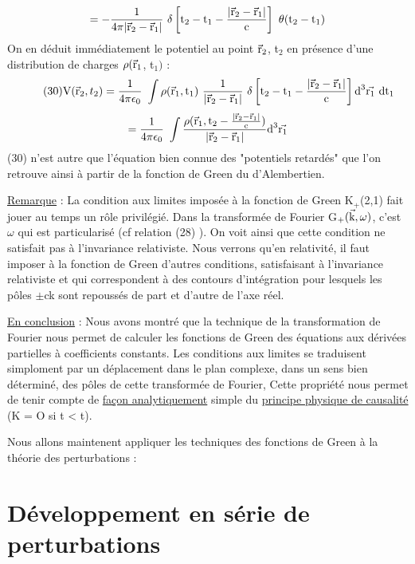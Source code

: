 \[
=-\frac{1}{4\pi|\vec{\mt{r}}_2-\vec{\mt{r}}_1|}\ \delta\left[\mt{t}_2-\mt{t}_1-\frac{|\vec{\mt{r}}_2-\vec{\mt{r}}_1|}{\mt{c}}\right]\ \theta(\mt{t}_2-\mt{t}_1)
\]
On en déduit immédiatement le potentiel au point $\vec{\text{r}}_2$, t$_2$  en présence d'une
distribution de charges $\rho(\vec{\text{r}}_1$, t$_1)$ :
\[
\tag{30}\mt{V}(\vec{\mt{r}}_2, t_2)=\frac{1}{4\pi\epsilon_0}\ \int \rho(\vec{\mt{r}}_1, \mt{t}_1)\ \frac{1}{|\vec{\mt{r}}_2-\vec{\mt{r}}_1|}\ 
\delta\left[\mt{t}_2-\mt{t}_1-\frac{|\vec{\mt{r}}_2-\vec{\mt{r}}_1|}{\mt{c}}\right]\mt{d}^3\vec{\mt{r}_1}\mt{ dt}_1
\]
\[
=\frac{1}{4\pi\epsilon_0}\ \int \frac{\rho(\vec{\mt{r}}_1, \mt{t}_2-\frac{|\vec{\mt{r}}_2-\vec{\mt{r}}_1|}{\mt{c}})}{|\vec{\mt{r}}_2-\vec{\mt{r}}_1|}
\mt{d}^3\vec{\mt{r}_1}
\]
(30) n'est autre que l'équation bien connue des "potentiels retardés" que
l'on retrouve ainsi à partir de la fonction de Green du d'Alembertien.

\ul{Remarque} : La condition aux limites imposée à la fonction de Green K$_+$(2,1)
fait jouer au temps un rôle privilégié. Dans la transformée de Fourier
G$_+(\vec{\text{k}}, \omega)$, c'est $\omega$ qui est particularisé (cf relation (28) ). On voit ainsi
que cette condition ne satisfait pas à l'invariance relativiste. Nous verrons qu'en relativité, il faut imposer à la fonction de Green d'autres conditions, satisfaisant à l'invariance relativiste et qui correspondent à des
contours d'intégration pour lesquels les pôles $\pm$ck sont repoussés de part
et d'autre de l'axe réel.

\ul{En conclusion} : Nous avons montré que la technique de la transformation
de Fourier nous permet de calculer les fonctions de Green des équations
aux dérivées partielles à coefficients constants. Les conditions aux
limites se traduisent simploment par un déplacement dans le plan complexe,
dans un sens bien déterminé, des pôles de cette transformée de Fourier,
Cette propriété nous permet de tenir compte de \ul{façon analytiquement} simple
du \ul{principe physique de causalité} (K = O si t < t).

Nous allons maintenent appliquer les techniques des fonctions
de Green à la théorie des perturbations :

\section{Développement en série de perturbations}%

